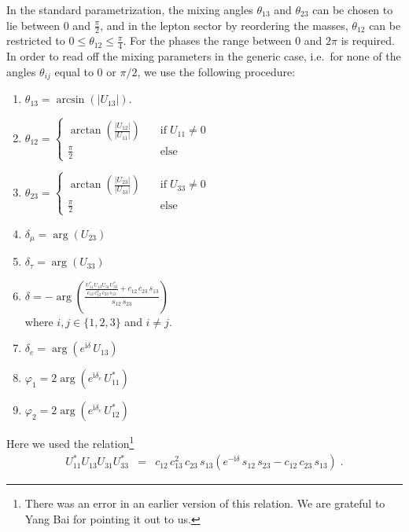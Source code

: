 \documentclass[12pt,a4paper,twoside]{scrartcl}
\def\I{\mathrm{i}}
\numberwithin{equation}{section}
\numberwithin{table}{section}
\begin{document}
In the standard parametrization, the mixing angles $\theta_{13}$ 
and $\theta_{23}$ can be chosen to lie between $0$ and $\frac{\pi}{2}$,
and in the lepton sector by reordering the masses, $\theta_{12}$ can be restricted to $0\le\theta_{12}\le\frac{\pi}{4}$.
For the phases the range between $0$ and $2\pi$ is required.
In order to read off the mixing parameters in the generic case, i.e.\ for none
of the angles $\theta_{ij}$ equal to 0 or $\pi/2$, we use the following
procedure:
\begin{enumerate}
 \item $\theta_{13}=\arcsin(|U_{13}|)$.
 \item $\displaystyle \theta_{12}=\left\{\begin{array}{ll}
 \displaystyle \arctan\left(\frac{|U_{12}|}{|U_{11}|}\right) \quad
        & \text{if}\;U_{11}\ne0\\
 \frac{\pi}{2} & \text{else}
 \end{array}\right.$
 \item $\displaystyle \theta_{23}=\left\{\begin{array}{ll}
 \displaystyle \arctan\left(\frac{|U_{23}|}{|U_{33}|}\right) \quad
        & \text{if}\;U_{33}\ne0\\
 \frac{\pi}{2} & \text{else}
 \end{array}\right.$
 \item $\delta_\mu = \arg(U_{23})$
 \item $\delta_\tau = \arg(U_{33})$
 \item \label{step6}$\displaystyle\delta=
 -\arg\left(\frac{\displaystyle\frac{U_{11}^*U_{13}U_{31}U_{33}^*}
        {c_{12}\,c_{13}^2\,c_{23}\,s_{13}}
        +c_{12}\,c_{23}\,s_{13}}
        {s_{12}\,s_{23}}\right)$\\
 where $i,j\in\{1,2,3\}$ and $i\ne j$.
 \item $\delta_e=\arg(e^{\I\delta}\,U_{13})$
 \item $\displaystyle\varphi_1=2\arg(e^{\I\delta_e}\,U_{11}^*)$
 \item \label{step9}$\displaystyle\varphi_2=2\arg(e^{\I\delta_e}\,U_{12}^*)$
\end{enumerate}
Here we used the relation\footnote{There was an error in an earlier version of
this relation. We are grateful to Yang Bai for pointing it out to us.}
\begin{eqnarray}
 U_{11}^*U_{13}U_{31}U_{33}^*
 & = &
 c_{12}\,c_{13}^2\, 
 c_{23}\,s_{13}
 \left(e^{-\I\delta}\,s_{12}\,s_{23} - c_{12}\,c_{23}\,s_{13}\right)
 \;.\nonumber
\end{eqnarray}
\end{document}
